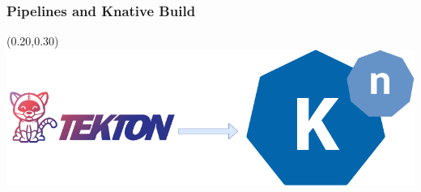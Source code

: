 \documentclass[aspectratio=169,11pt,hyperref={colorlinks=true}]{beamer}
\begin{document}
\begin{lblackrwhiteframe}
\begin{lblackrwhiteframe}
\begin{blackframe}
\begin{grayframe}
  \frametitle{Pipelines and Knative Build}
  \begin{textblock*}{0.5\paperwidth}(0.20\paperwidth,0.30\paperheight)
    \centering
    \includegraphics[width=0.6\paperwidth]{img/knative+tekton.png}
  \end{textblock*}
\end{grayframe}


\end{blackframe}
\end{lblackrwhiteframe}
\end{lblackrwhiteframe}
\end{document}
